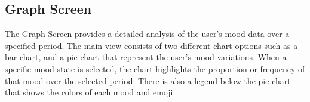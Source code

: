 \vspace{5mm}

\subsection{Graph Screen}

The Graph Screen provides a detailed analysis of the user's mood data over a specified period. The main view consists of two different chart options such as a bar chart, and a pie chart that represent the user's mood variations. When a specific mood state is selected, the chart highlights the proportion or frequency of that mood over the selected period. There is also a legend below the pie chart that shows the colors of each mood and emoji.

\vspace{5mm}

